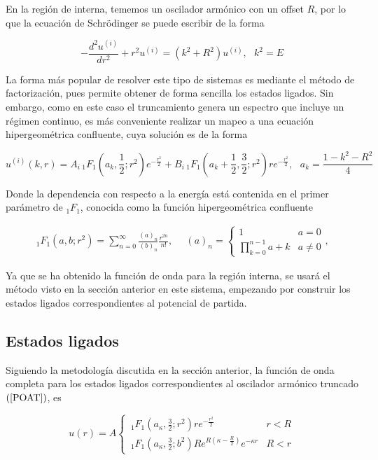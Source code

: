 En la región de interna, tememos un oscilador armónico con un offset $R$, por lo que la ecuación de Schrödinger se puede escribir de la forma

\begin{equation*}
-\frac{d^2 u^{(i)}}{dr^2} + r^2 u^{(i)}  = (k ^2 + R^2)u^{(i)} , \,\,\,\, k^2 = E
\end{equation*}

La forma más popular de resolver este tipo de sistemas es mediante el método de factorización, pues permite obtener de forma sencilla los estados ligados. Sin embargo, como en este caso el truncamiento genera un espectro que incluye un régimen continuo, es más conveniente realizar un mapeo a una ecuación hipergeométrica confluente, cuya solución es de la forma

\begin{equation}
	u^{(i)}(k,r) =A_i\,  _1F_1\left(a_k,\frac{1}{2};r^{2}\right) e^{-\frac{r^{2}}{2}} + B_i\,  _1F_1\left(a_k + \frac{1}{2},\frac{3}{2};r^{2}\right)re^{-\frac{r^{2}}{2}},\,\,\,\, a_k = \frac{1 - k^2 - R^2}{4} \label{OASC} 
\end{equation}

Donde la dependencia con respecto a la energía está contenida en el primer parámetro de $ _1F_1$, conocida como la función hipergeométrica confluente

\begin{eqnarray*}
\,  _1F_1\left(a, b ;r^{2}\right) = \sum_{n = 0}^{\infty}{\frac{(a)_n}{(b)_n}\frac{r^{2n}}{n!}},\,\,\, & (a)_n =
\begin{cases}
1 & a = 0
\\
\prod\limits_{k = 0}^{n-1} a + k & a \ne 0
\end{cases},
\end{eqnarray*}

Ya que se ha obtenido la función de onda para la región interna, se usará el método visto en la sección anterior en este sistema, empezando por construir los estados ligados correspondientes al potencial de partida.


\subsection{Estados ligados}

Siguiendo la metodología discutida en la sección anterior, la función de onda completa para los estados ligados correspondientes al oscilador armónico truncado $(\ref{POAT})$, es

\begin{equation*}
u(r)=A \begin{cases}
\,_1F_1\left(a_\kappa,\frac{3}{2};r^{2}\right)re^{-\frac{r^{2}}{2}} & r < R
\\\,_1F_1\left(a_\kappa,\frac{3}{2};b^{2}\right)R e^{R (\kappa -\frac{R}{2})} e^{-\kappa r} & R < r
\end{cases}
\end{equation*}

